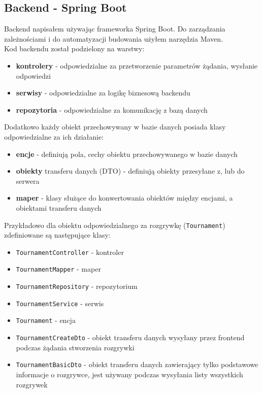 \documentclass[shortabstract]{iithesis}
\begin{document}
\subsection{Backend - Spring Boot}
Backend napisałem używając frameworka Spring Boot. Do zarządzania zależnościami i do automatyzacji budowania użyłem narzędzia Maven.
\\Kod backendu został podzielony na warstwy:
\begin{itemize}
    \item \textbf{kontrolery} - odpowiedzialne za przetworzenie parametrów żądania, wysłanie odpowiedzi
    \item \textbf{serwisy} - odpowiedzialne za logikę biznesową backendu
    \item \textbf{repozytoria} - odpowiedzialne za komunikację z bazą danych
\end{itemize}
Dodatkowo każdy obiekt przechowywany w bazie danych posiada klasy odpowiedzialne za ich działanie:
\begin{itemize}
    \item \textbf{encje} - definiują pola, cechy obiektu przechowywanego w bazie danych
    \item \textbf{obiekty} transferu danych (DTO) - definiują obiekty przesyłane z, lub do serwera
    \item \textbf{maper} - klasy służące do konwertowania obiektów między encjami, a obiektami transferu danych
\end{itemize}
Przykładowo dla obiektu odpowiedzialnego za rozgrywkę (\texttt{Tournament}) zdefiniowane są następujące klasy:
\begin{itemize}
    \item \texttt{TournamentController} - kontroler
    \item \texttt{TournamentMapper} - maper
    \item \texttt{TournamentRepository} - repozytorium
    \item \texttt{TournamentService} - serwis
    \item \texttt{Tournament} - encja
    \item \texttt{TournamentCreateDto} - obiekt transferu danych wysyłany przez frontend podczas żądania stworzenia rozgrywki
    \item \texttt{TournamentBasicDto} - obiekt transferu danych zawierający tylko podstawowe informacje o rozgrywce, jest używany podczas wysyłania listy wszystkich rozgrywek
\end{itemize}
\end{document}
